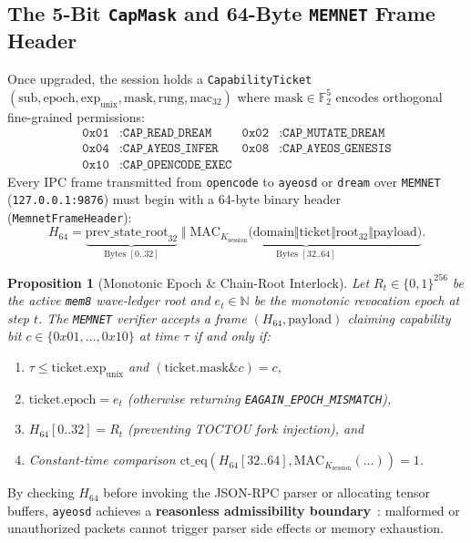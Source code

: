 \documentclass[10pt,twocolumn,letterpaper]{article}
\newtheorem{proposition}[theorem]{Proposition}
\begin{document}
\subsection{The 5-Bit \texttt{CapMask} and 64-Byte \texttt{MEMNET} Frame Header}
Once upgraded, the session holds a \texttt{CapabilityTicket} $(\text{sub}, \text{epoch}, \text{exp}_{\text{unix}}, \text{mask}, \text{rung}, \text{mac}_{32})$ where $\text{mask} \in \mathbb{F}_2^5$ encodes orthogonal fine-grained permissions:
\begin{align}
    \texttt{0x01} &: \texttt{CAP\_READ\_DREAM} & \texttt{0x02} &: \texttt{CAP\_MUTATE\_DREAM} \nonumber\\
    \texttt{0x04} &: \texttt{CAP\_AYEOS\_INFER} & \texttt{0x08} &: \texttt{CAP\_AYEOS\_GENESIS} \\
    \texttt{0x10} &: \texttt{CAP\_OPENCODE\_EXEC} \nonumber
\end{align}
Every IPC frame transmitted from \texttt{opencode} to \texttt{ayeosd} or \texttt{dream} over \texttt{MEMNET} (\texttt{127.0.0.1:9876}) must begin with a 64-byte binary header (\texttt{MemnetFrameHeader}):
\begin{equation}
    H_{64} = \underbrace{\text{prev\_state\_root}_{32}}_{\text{Bytes } [0..32]} \;\Vert\; \underbrace{\text{MAC}_{K_{\text{session}}}\!\bigl(\text{domain} \Vert \text{ticket} \Vert \text{root}_{32} \Vert \text{payload}\bigr)}_{\text{Bytes } [32..64]}.
\end{equation}

\begin{proposition}[Monotonic Epoch \& Chain-Root Interlock]
Let $R_t \in \{0,1\}^{256}$ be the active \texttt{mem8} wave-ledger root and $e_t \in \mathbb{N}$ be the monotonic revocation epoch at step $t$. The \texttt{MEMNET} verifier accepts a frame $(H_{64}, \text{payload})$ claiming capability bit $c \in \{0x01,\dots,0x10\}$ at time $\tau$ if and only if:
\begin{enumerate}[leftmargin=1.4em,itemsep=1pt,topsep=1pt]
    \item $\tau \le \text{ticket.exp}_{\text{unix}}$ and $(\text{ticket.mask} \mathbin{\&} c) = c$,
    \item $\text{ticket.epoch} = e_t$ (otherwise returning \texttt{EAGAIN\_EPOCH\_MISMATCH}),
    \item $H_{64}[0..32] = R_t$ (preventing TOCTOU fork injection), and
    \item Constant-time comparison $\text{ct\_eq}(H_{64}[32..64], \text{MAC}_{K_{\text{session}}}(\dots)) = 1$.
\end{enumerate}
\end{proposition}
\noindent
By checking $H_{64}$ before invoking the JSON-RPC parser or allocating tensor buffers, \texttt{ayeosd} achieves a \textbf{reasonless admissibility boundary}~\cite{guimond2026reasonless}: malformed or unauthorized packets cannot trigger parser side effects or memory exhaustion.
\end{document}
